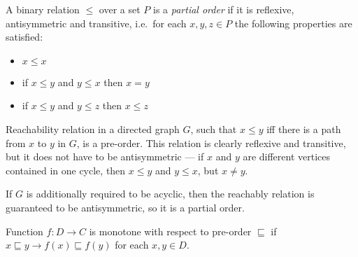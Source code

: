 \begin{defn}
A binary relation $\le$ over a set $P$ is a \emph{partial order} if it is reflexive, antisymmetric and transitive, i.e.\ for each $x, y, z \in P$ the following properties are satisfied:
\begin{itemize}
\item $x \le x$
\item if $x \le y$ and $y \le x$ then $x = y$
\item if $x \le y$ and $y \le z$ then $x \le z$
\end{itemize}
\end{defn}

\begin{exmp}
Reachability relation in a directed graph $G$, such that $x \le y$ iff there is a path from $x$ to $y$ in $G$, is a pre-order. This relation is clearly reflexive and transitive, but it does not have to be antisymmetric --- if $x$ and $y$ are different vertices contained in one cycle, then $x \le y$ and $y \le x$, but $x \ne y$.

If $G$ is additionally required to be acyclic, then the reachably relation is guaranteed to be antisymmetric, so it is a partial order.
\end{exmp}


\begin{defn}[Monotonicity]
Function $f: D \to C$ is monotone with respect to pre-order $\sqsubseteq$ if $x \sqsubseteq y \rightarrow f(x) \sqsubseteq f(y)$ for each $x, y \in D$.
\end{defn}
